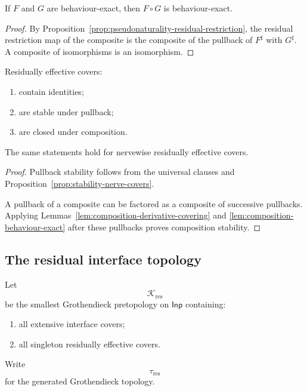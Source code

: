 \begin{lemma}
\label{lem:composition-behaviour-exact}
If \(F\) and \(G\) are behaviour-exact, then \(F\circ G\) is
behaviour-exact.
\end{lemma}

\begin{proof}
By
Proposition~\ref{prop:pseudonaturality-residual-restriction},
the residual restriction map of the composite is the composite of the
pullback of \(F^\sharp\) with \(G^\sharp\). A composite of isomorphisms is an
isomorphism.
\end{proof}

\begin{proposition}
\label{prop:stability-residually-effective-covers}
Residually effective covers:
\begin{enumerate}
    \item contain identities;
    \item are stable under pullback;
    \item are closed under composition.
\end{enumerate}
The same statements hold for nervewise residually effective covers.
\end{proposition}

\begin{proof}
Pullback stability follows from the universal clauses and
Proposition~\ref{prop:stability-nerve-covers}.

A pullback of a composite can be factored as a composite of successive
pullbacks. Applying
Lemmas~\ref{lem:composition-derivative-covering} and
\ref{lem:composition-behaviour-exact}
after these pullbacks proves composition stability.
\end{proof}

\subsection{The residual interface topology}
\label{subsec:residual-interface-topology}

\begin{definition}
\label{def:residual-interface-pretopology}
Let
\[
    \mathcal K_{\mathrm{res}}
\]
be the smallest Grothendieck pretopology on \(\mathsf{Inp}\) containing:
\begin{enumerate}
    \item all extensive interface covers;
    \item all singleton residually effective covers.
\end{enumerate}
Write
\[
    \tau_{\mathrm{res}}
\]
for the generated Grothendieck topology.
\end{definition}

